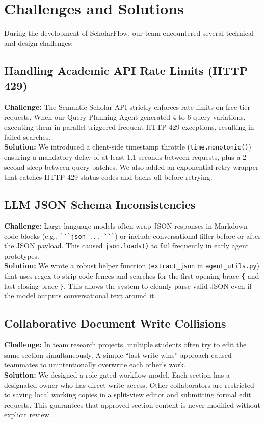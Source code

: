 \documentclass[11pt,a4paper]{article}
\begin{document}
\section{Challenges and Solutions}

During the development of ScholarFlow, our team encountered several technical and design challenges:

\subsection{Handling Academic API Rate Limits (HTTP 429)}
\textbf{Challenge:} The Semantic Scholar API strictly enforces rate limits on free-tier requests. When our Query Planning Agent generated 4 to 6 query variations, executing them in parallel triggered frequent HTTP 429 exceptions, resulting in failed searches. \\
\textbf{Solution:} We introduced a client-side timestamp throttle (\texttt{time.monotonic()}) ensuring a mandatory delay of at least 1.1 seconds between requests, plus a 2-second sleep between query batches. We also added an exponential retry wrapper that catches HTTP 429 status codes and backs off before retrying.

\subsection{LLM JSON Schema Inconsistencies}
\textbf{Challenge:} Large language models often wrap JSON responses in Markdown code blocks (e.g., \verb|```json ... ```|) or include conversational filler before or after the JSON payload. This caused \texttt{json.loads()} to fail frequently in early agent prototypes. \\
\textbf{Solution:} We wrote a robust helper function (\texttt{extract\_json} in \texttt{agent\_utils.py}) that uses regex to strip code fences and searches for the first opening brace \verb|{| and last closing brace \verb|}|. This allows the system to cleanly parse valid JSON even if the model outputs conversational text around it.

\subsection{Collaborative Document Write Collisions}
\textbf{Challenge:} In team research projects, multiple students often try to edit the same section simultaneously. A simple ``last write wins'' approach caused teammates to unintentionally overwrite each other's work. \\
\textbf{Solution:} We designed a role-gated workflow model. Each section has a designated owner who has direct write access. Other collaborators are restricted to saving local working copies in a split-view editor and submitting formal edit requests. This guarantees that approved section content is never modified without explicit review.
\end{document}
